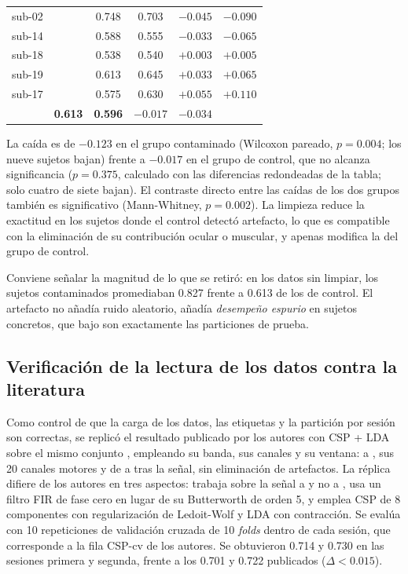 \begin{table}[H]
\begin{tabular}{llcccc}
sub-02 &       & 0.748 & 0.703 & $-0.045$ & $-0.090$ \\
sub-14 &       & 0.588 & 0.555 & $-0.033$ & $-0.065$ \\
sub-18 &       & 0.538 & 0.540 & $+0.003$ & $+0.005$ \\
sub-19 &       & 0.613 & 0.645 & $+0.033$ & $+0.065$ \\
sub-17 &       & 0.575 & 0.630 & $+0.055$ & $+0.110$ \\
\addlinespace[3pt]
\multicolumn{2}{l}{\textbf{Media}} & \textbf{0.613} & \textbf{0.596}
  & $\boldsymbol{-0.017}$ & $\boldsymbol{-0.034}$ \\
\bottomrule
\end{tabular}
\end{table}

La caída es de $-0.123$ en el grupo contaminado (Wilcoxon pareado, $p = 0.004$;
los nueve sujetos bajan) frente a $-0.017$ en el grupo de control, que no alcanza
significancia ($p = 0.375$, calculado con las diferencias redondeadas de la tabla; solo cuatro
de siete bajan). El contraste directo entre las caídas de los dos grupos también es
significativo (Mann-Whitney, $p = 0.002$). La limpieza reduce la exactitud en los sujetos
donde el control detectó artefacto, lo que es compatible con la eliminación de su
contribución ocular o muscular, y apenas modifica la del grupo de control.

Conviene señalar la magnitud de lo que se retiró: en los datos sin limpiar, los
sujetos contaminados promediaban 0.827 frente a 0.613 de los de control. El
artefacto no añadía ruido aleatorio, añadía \emph{desempeño espurio} en sujetos
concretos, que bajo \loso{} son exactamente las particiones de prueba.

\subsection{Verificación de la lectura de los datos contra la literatura}
\label{sec:replica}

Como control de que la carga de los datos, las etiquetas y la partición por sesión son
correctas, se replicó el resultado publicado por los autores con CSP + LDA sobre el mismo
conjunto \cite{lee2019}, empleando su banda, sus canales y su ventana:  a ,
sus 20 canales motores y de  a  tras la señal, sin eliminación de
artefactos. La réplica difiere de los autores en tres aspectos: trabaja sobre la señal a
 y no a , usa un filtro FIR de fase cero en lugar de su Butterworth de
orden 5, y emplea CSP de 8 componentes con regularización de Ledoit-Wolf y LDA con
contracción. Se evalúa con 10 repeticiones de validación cruzada de 10 \textit{folds} dentro de
cada sesión, que corresponde a la fila CSP-cv de los autores. Se
obtuvieron 0.714 y 0.730 en las sesiones primera y segunda, frente a los 0.701 y 0.722
publicados ($\Delta < 0.015$).

